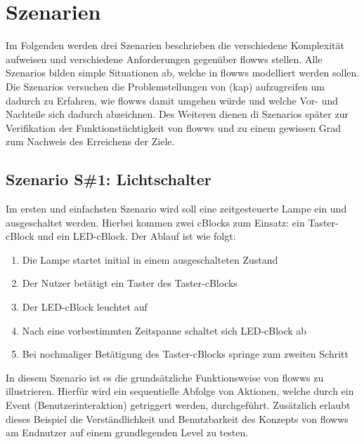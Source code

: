 \section{Szenarien}\label{sec:szenarien}
Im Folgenden werden drei Szenarien beschrieben die verschiedene Komplexität aufweisen und verschiedene Anforderungen gegenüber flowws stellen. Alle Szenarios bilden simple Situationen ab, welche in flowws modelliert werden sollen. Die Szenarios versuchen die Problemstellungen von (kap) aufzugreifen um dadurch zu Erfahren, wie flowws damit umgehen würde und welche Vor- und Nachteile sich dadurch abzeichnen. Des Weiteren dienen di Szenarios später zur Verifikation der Funktionstüchtigkeit von flowws und zu einem gewissen Grad zum Nachweis des Erreichens der Ziele. 

\subsection{Szenario S\#1: Lichtschalter}
Im ersten und einfachsten Szenario wird soll eine zeitgesteuerte Lampe ein und ausgeschaltet werden. Hierbei kommen zwei cBlocks zum Einsatz: ein Taster-cBlock und ein LED-cBlock. Der Ablauf ist wie folgt:
\begin{enumerate}
    \item Die Lampe startet initial in einem ausgeschalteten Zustand
    \item Der Nutzer betätigt ein Taster des Taster-cBlocks
    \item Der LED-cBlock leuchtet auf
    \item Nach eine vorbestimmten Zeitspanne schaltet sich LED-cBlock ab
    \item Bei nochmaliger Betätigung des Taster-cBlocks springe zum zweiten Schritt
\end{enumerate}
In diesem Szenario ist es die grundsätzliche Funktionsweise von flowws zu illustrieren. Hierfür wird ein sequentielle Abfolge von Aktionen, welche durch ein Event (Benutzerinteraktion) getriggert werden, durchgeführt. Zusätzlich erlaubt dieses Beispiel die Verständlichkeit und Benutzbarkeit des Konzepts von flowws am Endnutzer auf einem grundlegenden Level zu testen.

